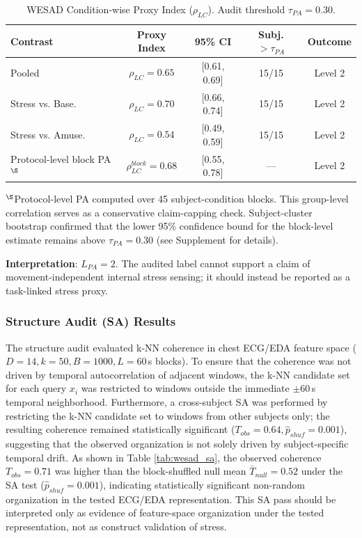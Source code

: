 \documentclass[journal]{IEEEtran}
\begin{document}
\begin{table}[t]
\caption{WESAD Condition-wise Proxy Index ($\rho_{LC}$). Audit threshold $\tau_{PA} = 0.30$.}
\label{tab:wesad_pa}
\centering
\begin{tabular}{@{}lcccc@{}}
\toprule
\textbf{Contrast} & \textbf{Proxy Index} & \textbf{95\% CI} & \textbf{Subj. $>\tau_{PA}$} & \textbf{Outcome} \\
\midrule
Pooled             & $\rho_{LC}=0.65$ & [0.61, 0.69] & 15/15 & Level 2 \\
Stress vs. Base.   & $\rho_{LC}=0.70$ & [0.66, 0.74] & 15/15 & Level 2 \\
Stress vs. Amuse.  & $\rho_{LC}=0.54$ & [0.49, 0.59] & 15/15 & Level 2 \\
Protocol-level block PA$^\S$ & $\rho^{block}_{LC}=0.68$ & [0.55, 0.78] & --- & Level 2 \\
\bottomrule
\end{tabular}
\begin{minipage}{\columnwidth}
\small $^\S$Protocol-level PA computed over 45 subject-condition blocks. This group-level correlation serves as a conservative claim-capping check. Subject-cluster bootstrap confirmed that the lower 95\% confidence bound for the block-level estimate remains above $\tau_{PA} = 0.30$ (see Supplement for details).
\end{minipage}
\end{table}

\textbf{Interpretation}: $L_{PA} = 2$. The audited label cannot support a claim of movement-independent internal stress sensing; it should instead be reported as a task-linked stress proxy. 

\subsubsection{Structure Audit (SA) Results}
The structure audit evaluated k-NN coherence in chest ECG/EDA feature space ($D=14, k=50, B=1000, L=60$\,s blocks). To ensure that the coherence was not driven by temporal autocorrelation of adjacent windows, the k-NN candidate set for each query $x_i$ was restricted to windows outside the immediate $\pm 60$\,s temporal neighborhood. Furthermore, a cross-subject SA was performed by restricting the k-NN candidate set to windows from other subjects only; the resulting coherence remained statistically significant ($T_{obs}=0.64, \hat{p}_{shuf}=0.001$), suggesting that the observed organization is not solely driven by subject-specific temporal drift. As shown in Table \ref{tab:wesad_sa}, the observed coherence $T_{obs}=0.71$ was higher than the block-shuffled null mean $\bar{T}_{null}=0.52$ under the SA test ($\hat{p}_{shuf}=0.001$), indicating statistically significant non-random organization in the tested ECG/EDA representation. This SA pass should be interpreted only as evidence of feature-space organization under the tested representation, not as construct validation of stress.
\enlargethispage{2\baselineskip}
\end{document}
